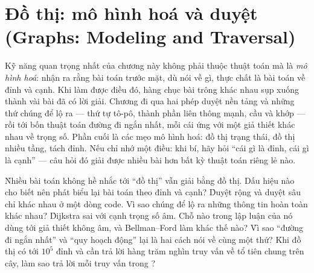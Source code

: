 \documentclass[../../algorithm.tex]{subfiles}
\begin{document}
\chapter{Đồ thị: mô hình hoá và duyệt (Graphs: Modeling and Traversal)}

\begin{tomtat}
Kỹ năng quan trọng nhất của chương này không phải thuộc thuật toán mà là \emph{mô hình hoá}: nhận ra rằng bài toán trước mặt, dù nói về gì, thực chất là bài toán về đỉnh và cạnh. Khi làm được điều đó, hàng chục bài trông khác nhau sụp xuống thành vài bài đã có lời giải. Chương đi qua hai phép duyệt nền tảng và những thứ chúng để lộ ra --- thứ tự tô-pô, thành phần liên thông mạnh, cầu và khớp --- rồi tới bốn thuật toán đường đi ngắn nhất, mỗi cái ứng với một giả thiết khác nhau về trọng số. Phần cuối là các mẹo mô hình hoá: đồ thị trạng thái, đồ thị nhiều tầng, tách đỉnh. Nếu chỉ nhớ một điều: khi bí, hãy hỏi ``cái gì là đỉnh, cái gì là cạnh'' --- câu hỏi đó giải được nhiều bài hơn bất kỳ thuật toán riêng lẻ nào.
\end{tomtat}

\begin{nentang}
\end{nentang}

\begin{khoigoi}
\h{Nhiều bài toán không hề nhắc tới ``đồ thị'' vẫn giải bằng đồ thị. Dấu hiệu nào cho biết nên phát biểu lại bài toán theo đỉnh và cạnh?}
\h{Duyệt rộng và duyệt sâu chỉ khác nhau ở một dòng code. Vì sao chúng để lộ ra những thông tin hoàn toàn khác nhau?}
\h{Dijkstra sai với cạnh trọng số âm. Chỗ nào trong lập luận của nó dùng tới giả thiết không âm, và Bellman--Ford làm khác thế nào?}
\h{Vì sao ``đường đi ngắn nhất'' và ``quy hoạch động'' lại là hai cách nói về cùng một thứ?}
\h{Khi đồ thị có tới \(10^5\) đỉnh và cần trả lời hàng trăm nghìn truy vấn về tổ tiên chung trên cây, làm sao trả lời mỗi truy vấn trong ?}
\end{khoigoi}
\end{document}
